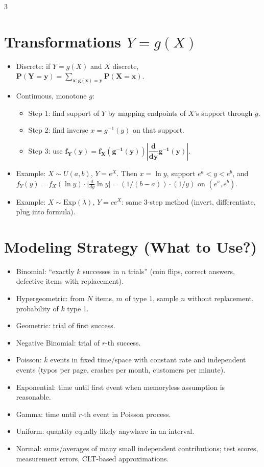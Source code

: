 \documentclass[11pt,landscape]{article}
\begin{document}
\begin{multicols}{3}
\section{Transformations $Y=g(X)$}
\begin{itemize}
  \item Discrete: if $Y=g(X)$ and $X$ discrete, $\mathbf{P(Y=y)=\sum_{x: g(x)=y} P(X=x)}$.
  \item Continuous, monotone $g$:
    \begin{itemize}
      \item Step 1: find support of $Y$ by mapping endpoints of $X$'s support through $g$.
      \item Step 2: find inverse $x=g^{-1}(y)$ on that support.
      \item Step 3: use $\mathbf{f_Y(y)=f_X(g^{-1}(y))\left|\dfrac{d}{dy}g^{-1}(y)\right|}$.
    \end{itemize}
  \item Example: $X\sim U(a,b)$, $Y=e^X$. Then $x=\ln y$, support $e^a<y<e^b$, and $f_Y(y)=f_X(\ln y)\cdot\big|\tfrac{d}{dy}\ln y\big|=(1/(b-a))\cdot(1/y)$ on $(e^a,e^b)$.
  \item Example: $X\sim\text{Exp}(\lambda)$, $Y=c e^X$: same 3-step method (invert, differentiate, plug into formula).
\end{itemize}

\section{Modeling Strategy (What to Use?)}
\begin{itemize}
  \item Binomial: “exactly $k$ successes in $n$ trials” (coin flips, correct answers, defective items with replacement).
  \item Hypergeometric: from $N$ items, $m$ of type 1, sample $n$ without replacement, probability of $k$ type 1.
  \item Geometric: trial of first success.
  \item Negative Binomial: trial of $r$-th success.
  \item Poisson: $k$ events in fixed time/space with constant rate and independent events (typos per page, crashes per month, customers per minute).
  \item Exponential: time until first event when memoryless assumption is reasonable.
  \item Gamma: time until $r$-th event in Poisson process.
  \item Uniform: quantity equally likely anywhere in an interval.
  \item Normal: sums/averages of many small independent contributions; test scores, measurement errors, CLT-based approximations.
\end{itemize}


\end{multicols}
\end{document}
